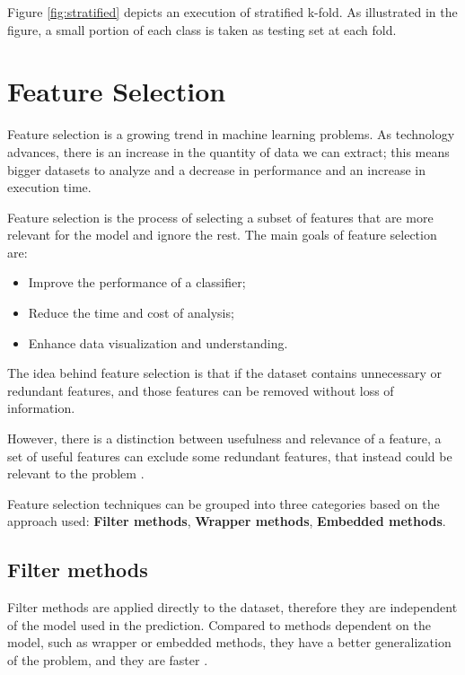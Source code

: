 Figure \ref{fig:stratified} depicts an execution of stratified k-fold. As illustrated in the figure, a small portion of each class is taken as testing set at each fold.





\section{Feature Selection}
\label{sec:feat_sel}
Feature selection is a growing trend in machine learning problems. As technology advances, there is an increase in the quantity of data we can extract; this means bigger datasets to analyze and a decrease in performance and an increase in execution time. 

Feature selection \cite{guyon2003introduction} is the process of selecting a subset of features that are more relevant for the model and ignore the rest.
The main goals of feature selection are: 
\begin{itemize}
	\item Improve the performance of a classifier;
	\item Reduce the time and cost of analysis;
	\item Enhance data visualization and understanding.
\end{itemize}

The idea behind feature selection is that if the dataset contains unnecessary or redundant features, and those features can be removed without loss of information. \cite{bermingham2015application}

However, there is a distinction between usefulness and relevance of a feature, a set of useful features can exclude some redundant features, that instead could be relevant to the problem \cite{kohavi1997wrappers}.

Feature selection techniques can be grouped into three categories based on the approach used: \textbf{Filter methods}, \textbf{Wrapper methods}, \textbf{Embedded methods}.

\subsection{Filter methods}
Filter methods \cite{kohavi1997wrappers} are applied directly to the dataset, therefore they are independent of the model used in the prediction. Compared to methods dependent on the model, such as wrapper or embedded methods, they have a better generalization of the problem, and they are faster .

